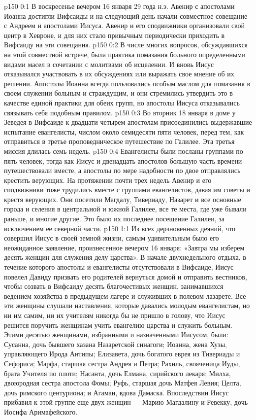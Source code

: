 \author{Комиссия срединников}
\vs p150 0:1 В воскресенье вечером 16 января 29 года н.э. Авенир с апостолами Иоанна достигли Вифсаиды и на следующий день начали совместное совещание с Андреем и апостолами Иисуса. Авенир и его сподвижники организовали свой центр в Хевроне, и для них стало привычным периодически приходить в Вифсаиду на эти совещания.
\vs p150 0:2 В числе многих вопросов, обсуждавшихся на этой совместной встрече, была практика помазания больного определенными видами масел в сочетании с молитвами об исцелении. И вновь Иисус отказывался участвовать в их обсуждениях или выражать свое мнение об их решении. Апостолы Иоанна всегда пользовались особым маслом для помазания в своем служении больным и страждущим, и они стремились утвердить это в качестве единой практики для обеих групп, но апостолы Иисуса отказывались связывать себя подобным правилом.
\vs p150 0:3 \pc Во вторник 18 января в доме у Зеведея в Вифсаиде к двадцати четырем апостолам присоединились выдержавшие испытание евангелисты, числом около семидесяти пяти человек, перед тем, как отправиться в третье проповедническое путешествие по Галилее. Эта третья миссия длилась семь недель.
\vs p150 0:4 Евангелисты были посланы группами по пять человек, тогда как Иисус и двенадцать апостолов большую часть времени путешествовали вместе, а апостолы по мере надобности по двое отправлялись крестить верующих. На протяжении почти трех недель Авенир и его сподвижники тоже трудились вместе с группами евангелистов, давая им советы и крестя верующих. Они посетили Магдалу, Тивериаду, Назарет и все основные города и селения в центральной и южной Галилее, все те места, где уже бывали раньше, и многие другие. Это было их последнее посещение Галилеи, за исключением ее северной части.
\vs p150 1:1 Из всех дерзновенных деяний, что совершил Иисус в своей земной жизни, самым удивительным было его неожиданное заявление, произнесенное вечером 16 января: «Завтра мы изберем десять женщин для служения делу царства». В начале двухнедельного отдыха, в течение которого апостолы и евангелисты отсутствовали в Вифсаиде, Иисус повелел Давиду призвать его родителей вернуться домой и отправить вестников, чтобы созвать в Вифсаиду десять благочестивых женщин, занимавшихся ведением хозяйства в предыдущем лагере и служивших в полевом лазарете. Все эти женщины слушали наставления, которые давались молодым евангелистам, но ни им самим, ни их учителям никогда бы не пришло в голову, что Иисус решится поручить женщинам учить евангелию царства и служить больным. Этими десятью женщинами, избранными и назначенными Иисусом, были: Сусанна, дочь бывшего хазана Назаретской синагоги; Иоанна, жена Хузы, управляющего Ирода Антипы; Елизавета, дочь богатого еврея из Тивериады и Сефориса; Марфа, старшая сестра Андрея и Петра; Рахиль, свояченица Иуды, брата Учителя по плоти; Насанта, дочь Елмана, сирийского лекаря; Милха, двоюродная сестра апостола Фомы; Руфь, старшая дочь Матфея Левия; Целта, дочь римского центуриона; и Агаман, вдова Дамаска. Впоследствии Иисус прибавил к этой группе еще двух женщин --- Марию Магдалину и Ревекку, дочь Иосифа Аримафейского.
